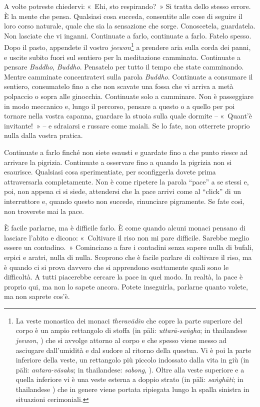 A volte potreste chiedervi: «~Ehi, sto respirando?~» Si tratta dello
stesso errore. È la mente che pensa. Qualsiasi cosa succeda, consentite
alle cose di seguire il loro corso naturale, quale che sia la sensazione
che sorge. Conoscetela, guardatela. Non lasciate che vi inganni.
Continuate a farlo, continuate a farlo. Fatelo spesso. Dopo il pasto,
appendete il vostro \emph{jeewon}\footnote{La veste monastica dei monaci
  \emph{theravādin} che copre la parte superiore del corpo è un ampio
  rettangolo di stoffa (in pāli: \emph{uttarā-saṅgha}; in thailandese
  \emph{jeewon}, ) che si avvolge attorno al corpo e che spesso
  viene messo ad asciugare dall'umidità e dal sudore al ritorno della
  questua. Vi è poi la parte inferiore della veste, un rettangolo più
  piccolo indossato dalla vita in giù (in pāli: \emph{antara-vāsaka}; in
  thailandese: \emph{sabong}, ). Oltre alla veste superiore e a
  quella inferiore vi è una veste esterna a doppio strato (in pāli:
  \emph{saṅghāti}; in thailandese ) che in
  genere viene portata ripiegata lungo la spalla sinistra in situazioni
  cerimoniali.} a prendere aria sulla corda dei panni, e uscite subito
fuori sul sentiero per la meditazione camminata. Continuate a pensare
\emph{Buddho}, \emph{Buddho}. Pensatelo per tutto il tempo che state
camminando. Mentre camminate concentratevi sulla parola \emph{Buddho}.
Continuate a consumare il sentiero, consumatelo fino a che non scavate
una fossa che vi arriva a metà polpaccio o sopra alle ginocchia.
Continuate solo a camminare. Non è passeggiare in modo meccanico e,
lungo il percorso, pensare a questo o a quello per poi tornare nella
vostra capanna, guardare la stuoia sulla quale dormite -- «~Quant'è
invitante!~» -- e sdraiarsi e russare come maiali. Se lo fate, non
otterrete proprio nulla dalla vostra pratica.

Continuate a farlo finché non siete esausti e guardate fino a che punto
riesce ad arrivare la pigrizia. Continuate a osservare fino a quando la
pigrizia non si esaurisce. Qualsiasi cosa sperimentiate, per
sconfiggerla dovete prima attraversarla completamente. Non è come
ripetere la parola ``pace'' a se stessi e, poi, non appena ci si siede,
attendersi che la pace arrivi come al ``click'' di un interruttore e,
quando questo non succede, rinunciare pigramente. Se fate così, non
troverete mai la pace.

È facile parlarne, ma è difficile farlo. È come quando alcuni monaci
pensano di lasciare l'abito e dicono: «~Coltivare il riso non mi pare
difficile. Sarebbe meglio essere un contadino.~» Cominciano a fare i
contadini senza sapere nulla di bufali, erpici e aratri, nulla di nulla.
Scoprono che è facile parlare di coltivare il riso, ma è quando ci si
prova davvero che si apprendono esattamente quali sono le difficoltà. A
tutti piacerebbe cercare la pace in quel modo. In realtà, la pace è
proprio qui, ma non lo sapete ancora. Potete inseguirla, parlarne quanto
volete, ma non saprete cos'è.

